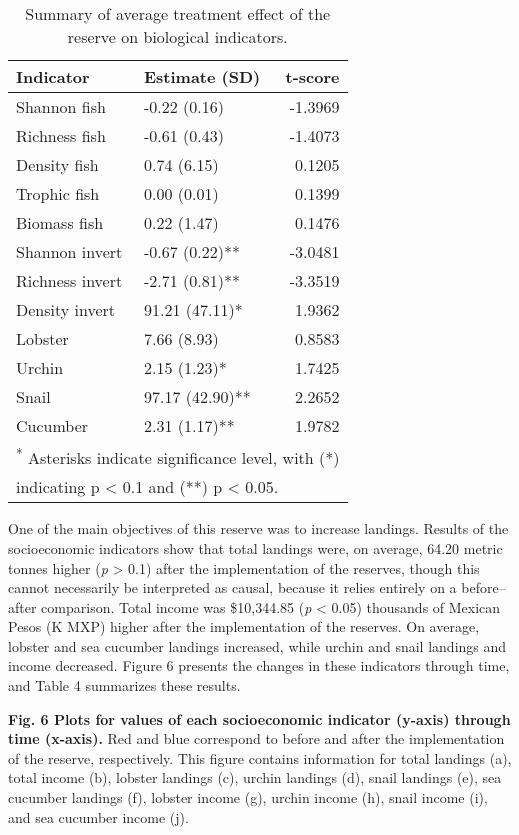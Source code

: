 \documentclass[12pt,]{article}
\begin{document}
\begin{table}

\caption{\label{tab:table of bio results}Summary of average treatment effect of the reserve on biological indicators.}
\centering
\begin{tabular}[t]{l|l|r}
\hline
Indicator & Estimate (SD) & t-score\\
\hline
Shannon fish & -0.22 (0.16) & -1.3969\\
\hline
Richness fish & -0.61 (0.43) & -1.4073\\
\hline
Density fish & 0.74 (6.15) & 0.1205\\
\hline
Trophic fish & 0.00 (0.01) & 0.1399\\
\hline
Biomass fish & 0.22 (1.47) & 0.1476\\
\hline
Shannon invert & -0.67 (0.22)** & -3.0481\\
\hline
Richness invert & -2.71 (0.81)** & -3.3519\\
\hline
Density invert & 91.21 (47.11)* & 1.9362\\
\hline
Lobster & 7.66 (8.93) & 0.8583\\
\hline
Urchin & 2.15 (1.23)* & 1.7425\\
\hline
Snail & 97.17 (42.90)** & 2.2652\\
\hline
Cucumber & 2.31 (1.17)** & 1.9782\\
\hline
\multicolumn{3}{l}{\textsuperscript{*} Asterisks indicate significance level, with (*)}\\
\multicolumn{3}{l}{indicating p < 0.1 and (**) p < 0.05.}\\
\end{tabular}
\end{table}

One of the main objectives of this reserve was to increase landings.
Results of the socioeconomic indicators show that total landings were,
on average, 64.20 metric tonnes higher (\emph{p} \textgreater{} 0.1)
after the implementation of the reserves, though this cannot necessarily
be interpreted as causal, because it relies entirely on a before--after
comparison. Total income was \$10,344.85 (\emph{p} \textless{} 0.05)
thousands of Mexican Pesos (K MXP) higher after the implementation of
the reserves. On average, lobster and sea cucumber landings increased,
while urchin and snail landings and income decreased. Figure 6 presents
the changes in these indicators through time, and Table 4 summarizes
these results.

\textbf{Fig. 6 Plots for values of each socioeconomic indicator (y-axis)
through time (x-axis).} Red and blue correspond to before and after the
implementation of the reserve, respectively. This figure contains
information for total landings (a), total income (b), lobster landings
(c), urchin landings (d), snail landings (e), sea cucumber landings (f),
lobster income (g), urchin income (h), snail income (i), and sea
cucumber income (j).
\end{document}

